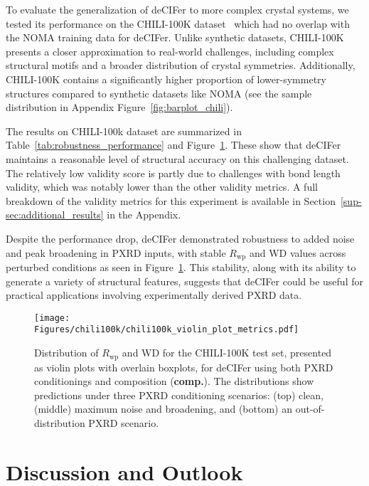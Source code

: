 To evaluate the generalization of deCIFer to more complex crystal systems, we tested its performance on the CHILI-100K dataset~\cite{FriisJensenJohansen2024} which had no overlap with the NOMA training data for deCIFer. Unlike synthetic datasets, CHILI-100K presents a closer approximation to real-world challenges, including complex structural motifs and a broader distribution of crystal symmetries. Additionally, CHILI-100K contains a significantly higher proportion of lower-symmetry structures compared to synthetic datasets like NOMA (see the sample distribution in Appendix Figure~\ref{fig:barplot_chili}). 

The results on CHILI-100k dataset are summarized in Table~\ref{tab:robustness_performance} and Figure~\ref{fig:violinplot_chili}. These show that deCIFer maintains a reasonable level of structural accuracy on this challenging dataset. The relatively low validity score is partly due to challenges with bond length validity, which was notably lower than the other validity metrics. A full breakdown of the validity metrics for this experiment is available in Section~\ref{sup-sec:additional_results} in the Appendix.

Despite the performance drop, deCIFer demonstrated robustness to added noise and peak broadening in PXRD inputs, with stable $R_{\mathrm{wp}}$ and WD values across perturbed conditions as seen in Figure~\ref{fig:violinplot_chili}. This stability, along with its ability to generate a variety of structural features, suggests that deCIFer could be useful for practical applications involving experimentally derived PXRD data.

\begin{figure}[t!]
\begin{center}
\centerline{\texttt{[image: Figures/chili100k/chili100k\_violin\_plot\_metrics.pdf]}}
\caption{Distribution of $R_{\mathrm{wp}}$ and WD for the CHILI-100K test set, presented as violin plots with overlain boxplots, for deCIFer using both PXRD conditionings and composition (\textbf{comp.}). The distributions show predictions under three PXRD conditioning scenarios: (top) clean, (middle) maximum noise and broadening, and (bottom) an out-of-distribution PXRD scenario.}
\label{fig:violinplot_chili}
\end{center}
\vspace{-0.4cm}
\end{figure}

\section{Discussion and Outlook}\label{sec:discussion}

